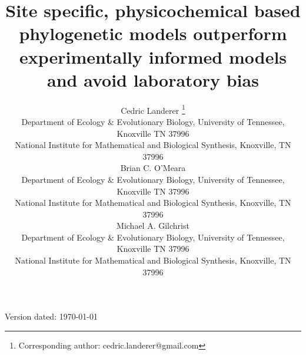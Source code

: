 \documentclass[fleqn,letterpaper]{article}
\begin{document}
\doublespacing
\linenumbers


\newcommand{\Lik}{\ensuremath{\hat{\text{Lik}}}\xspace} %
\newcommand{\GL}{\ensuremath{\text{GL}}\xspace} %
\newcommand{\selacDMS}{\emph{SelAC}+DMS\xspace}
\newcommand{\phydms}{\emph{phydms}\xspace}
\newcommand{\selac}{\emph{SelAC}\xspace}
\newcommand{\ecoli}{\textit{E. coli}\xspace}
\newcommand{\gy}{\emph{GY94}\xspace}
\newcommand{\hb}{\emph{HB98}\xspace}
\newcommand{\PC}{physicochemical\xspace}  
\newcommand{\DeltaAIC}{\ensuremath{\Delta\text{AIC}}\xspace}  

\makeatletter
\long{}
\makeatother

  
\title{Site specific, \PC based phylogenetic models outperform experimentally informed models and avoid laboratory bias}



\author{
  Cedric Landerer \thanks{Corresponding author: cedric.landerer@gmail.com}\\
  \small  Department of Ecology \& Evolutionary  Biology, University of Tennessee, Knoxville TN 37996\\
  \small National Institute for Mathematical and Biological Synthesis, Knoxville, TN 37996\\
  Brian C. O'Meara \\
  \small  Department of Ecology \& Evolutionary  Biology, University of Tennessee, Knoxville TN 37996\\
  \small National Institute for Mathematical and Biological Synthesis, Knoxville, TN 37996\\
  Michael A. Gilchrist\\
  \small  Department of Ecology \& Evolutionary  Biology, University of Tennessee, Knoxville TN 37996\\
  \small National Institute for Mathematical and Biological Synthesis, Knoxville, TN 37996\\
}



\maketitle

\vfill
\centerline{Version dated: \today}
\vfill
\newpage
\end{document}
